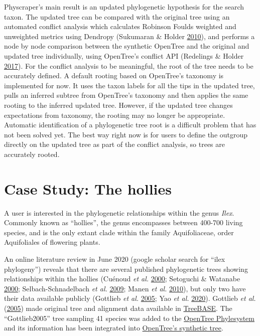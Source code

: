 \documentclass[]{article}
\begin{document}
Physcraper's main result is an updated phylogenetic hypothesis for the search taxon.
The updated tree can be compared with the original tree using an automated conflict analysis which calculates Robinson Foulds weighted and unweighted metrics using Dendropy (Sukumaran \& Holder \protect\hyperlink{ref-sukumaran2010dendropy}{2010}), and performs a node by node comparison between the synthetic OpenTree and the original and updated tree individually, using OpenTree's conflict API (Redelings \& Holder \protect\hyperlink{ref-redelings2017supertree}{2017}).
For the conflict analysis to be meaningful, the root of the tree needs to be accurately defined. A default rooting based on OpenTree's taxonomy is implemented for now. It uses the taxon labels for all the tips in the updated tree, pulls an inferred subtree from OpenTree's taxonomy and then applies the same rooting to the inferred updated tree. However, if the updated tree changes expectations from taxonomy, the rooting may no longer be appropriate. Automatic identification of a phylogenetic tree root is a difficult problem that has not been solved yet. The best way right now is for users to define the outgroup directly on the updated tree as part of the conflict analysis, so trees are accurately rooted.

\hypertarget{case-study-the-hollies}{%
\section{Case Study: The hollies}\label{case-study-the-hollies}}

A user is interested in the phylogenetic relationships within the genus \emph{Ilex}. Commonly known as ``hollies'', the genus encompasses between 400-700 living species, and is the only extant clade within the family Aquifoliaceae, order Aquifoliales of flowering plants.

An online literature review in June 2020 (google scholar search for ``ilex phylogeny'') reveals that there are several published phylogenetic trees showing relationships within the hollies (Cuénoud \emph{et al.} \protect\hyperlink{ref-cuenoud2000molecular}{2000}; Setoguchi \& Watanabe \protect\hyperlink{ref-setoguchi2000intersectional}{2000}; Selbach-Schnadelbach \emph{et al.} \protect\hyperlink{ref-selbach2009new}{2009}; Manen \emph{et al.} \protect\hyperlink{ref-manen2010history}{2010}), but only two have their data available publicly (Gottlieb \emph{et al.} \protect\hyperlink{ref-gottlieb2005molecular}{2005}; Yao \emph{et al.} \protect\hyperlink{ref-yao2020phylogeny}{2020}).
Gottlieb \emph{et al.} (\protect\hyperlink{ref-gottlieb2005molecular}{2005}) made original tree and alignment data available in \href{https://treebase.org/treebase-web/search/study/summary.html?id=1091}{TreeBASE}. The ``Gottlieb2005'' tree sampling 41 species was added to the \href{https://tree.opentreeoflife.org/curator/study/edit/pg_2827/?tab=home}{OpenTree Phylesystem} and its information has been integrated into \href{https://devtree.opentreeoflife.org/opentree/opentree12.3@mrcaott68451ott89474/Ilex-theizans--Ilex-dumosa}{OpenTree's synthetic tree}.
\end{document}
